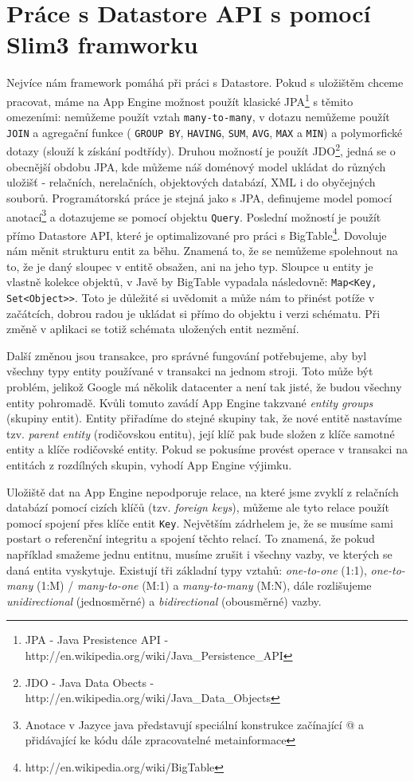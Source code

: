 \section{Práce s Datastore API s pomocí Slim3 framworku}
Nejvíce nám framework pomáhá při práci s Datastore. Pokud s uložištěm chceme pracovat, máme na App Engine možnost použít klasické JPA\footnote{JPA - Java Presistence API - http://en.wikipedia.org/wiki/Java\_Persistence\_API} s těmito omezeními: nemůžeme použít vztah \verb|many-to-many|, v dotazu nemůžeme použít \verb|JOIN| a agregační funkce ( \verb|GROUP BY|,  \verb|HAVING|,  \verb|SUM|,  \verb|AVG|,  \verb|MAX| a  \verb|MIN|) a polymorfické dotazy (slouží k získání podtřídy). Druhou možností je použít JDO\footnote{JDO - Java Data Obects - http://en.wikipedia.org/wiki/Java\_Data\_Objects}, jedná se o obecnější obdobu JPA, kde můžeme náš doménový model ukládat do různých uložišť - relačních, nerelačních, objektových databází,  XML i do obyčejných souborů. Programátorská práce je stejná jako s JPA, definujeme model pomocí anotací\footnote{Anotace v Jazyce java představují speciální konstrukce začínající @ a přidávající ke kódu dále zpracovatelné metainformace} a dotazujeme se pomocí objektu \verb|Query|. Poslední možností je použít přímo Datastore API, které je optimalizované pro práci s BigTable\footnote{http://en.wikipedia.org/wiki/BigTable}. Dovoluje nám měnit strukturu entit za běhu. Znamená to, že se nemůžeme spolehnout na to, že je daný sloupec v entitě obsažen, ani na jeho typ. Sloupce u entity je vlastně kolekce objektů, v Javě by BigTable vypadala následovně: \verb|Map<Key, Set<Object>>|. Toto je důležité si uvědomit a může nám to přinést potíže v začátcích, dobrou radou je ukládat si přímo do objektu i verzi schématu. Při změně v aplikaci se totiž schémata uložených entit nezmění. 

Další změnou jsou transakce, pro správné fungování potřebujeme, aby byl všechny typy entity používané v transakci na jednom stroji. Toto může být problém, jelikož Google má několik datacenter a není tak jisté, že budou všechny entity pohromadě. Kvůli tomuto zavádí App Engine takzvané \emph{entity groups} (skupiny entit). Entity přiřadíme do stejné skupiny tak, že nové entitě nastavíme tzv. \emph{parent entity} (rodičovskou entitu), její klíč pak bude složen z klíče samotné entity a klíče rodičovské entity. Pokud se pokusíme provést operace v transakci na entitách z rozdílných skupin, vyhodí App Engine výjimku.

Uložiště dat na App Engine nepodporuje relace, na které jsme zvyklí z relačních databází pomocí cizích klíčů (tzv. \emph{foreign keys}), můžeme ale tyto relace použít pomocí spojení přes klíče entit \verb|Key|. Největším zádrhelem je, že se musíme sami postart o referenční integritu a spojení těchto relací. To znamená, že pokud například smažeme jednu entitnu, musíme zrušit i všechny vazby, ve kterých se daná entita vyskytuje. Existují tři základní typy vztahů: \emph{one-to-one} (1:1), \emph{one-to-many} (1:M) / \emph{many-to-one} (M:1) a \emph{many-to-many} (M:N), dále rozlišujeme \emph{unidirectional} (jednosměrné) a \emph{bidirectional} (obousměrné) vazby. 

